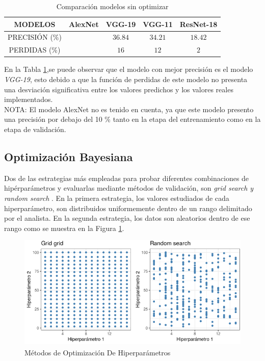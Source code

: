 	\begin{table}[ht]
		\centering
		\begin{tabular}{|c|c|c|c|c|}
			\hline
			MODELOS & AlexNet & VGG-19 & VGG-11 & ResNet-18 \\
			\hline
			PRECISIÓN (\%) &  & $$36.84$$ & $$34.21$$ & $$18.42$$ \\
			\hline
			PERDIDAS (\%) &  & $$16$$ & $$12$$ & $$2$$ \\
			\hline
		\end{tabular}	
		\caption{Comparación modelos sin optimizar}
		\label{table:compasin}
	\end{table}	
	
	En la Tabla \ref{table:compasin},se puede observar que el modelo con mejor precisión es el modelo \textit{VGG-19}, esto debido a que la función de perdidas de este modelo no presenta una desviación significativa entre los valores predichos y los valores reales implementados.
	\\
	NOTA: El modelo AlexNet no es tenido en cuenta, ya que este modelo presento una precisión por debajo del 10 \% tanto en la etapa del entrenamiento como en la etapa de validación.

			
	\newpage
	\subsection{Optimización Bayesiana}
	
	Dos de las estrategias más empleadas para probar diferentes combinaciones de hipérparámetros y evaluarlas mediante métodos de validación, son \textit{grid search y random search} \cite{liashchynskyi2019grid}. En la primera estrategia, los valores estudiados de cada hiperparámetro, son distribuidos uniformemente dentro de un rango delimitado por el analista. En la segunda estrategia, los datos son aleatorios dentro de ese rango como se muestra en la Figura \ref{fig:Hiperparámetros grid search y random search}.
	
	\begin{figure}[ht]
		\centering
		\includegraphics[scale=0.6]{Figs/121.png}
		\caption{Métodos de Optimización De Hiperparámetros}
		\label{fig:Hiperparámetros grid search y random search}
	\end{figure}
	
